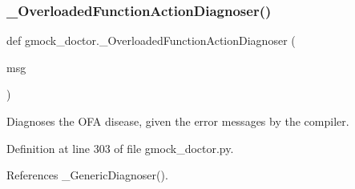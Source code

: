 \subsubsection{\texorpdfstring{\+\_\+\+Overloaded\+Function\+Action\+Diagnoser()}{\_OverloadedFunctionActionDiagnoser()}}
{\footnotesize\ttfamily def gmock\+\_\+doctor.\+\_\+\+Overloaded\+Function\+Action\+Diagnoser (\begin{DoxyParamCaption}\item[{}]{msg }\end{DoxyParamCaption})\hspace{0.3cm}{\ttfamily [private]}}

\begin{DoxyVerb}Diagnoses the OFA disease, given the error messages by the compiler.\end{DoxyVerb}
 

Definition at line 303 of file gmock\+\_\+doctor.\+py.



References \+\_\+\+Generic\+Diagnoser().


